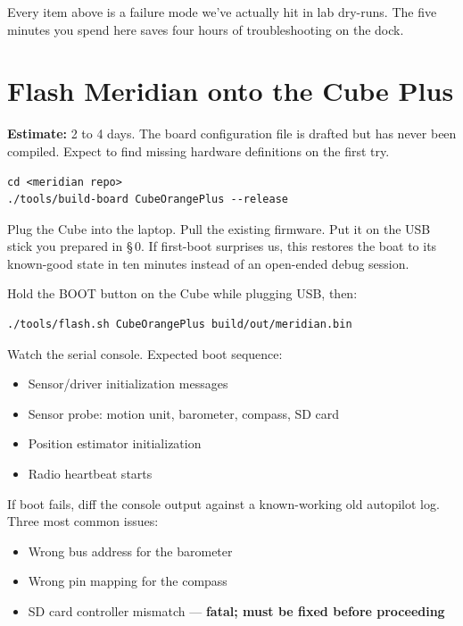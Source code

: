 \documentclass[10pt,a4paper]{article}
\begin{document}
\begin{tipbox}
Every item above is a failure mode we've actually hit in lab dry-runs.
The five minutes you spend here saves four hours of troubleshooting
on the dock.
\end{tipbox}

\section{Flash Meridian onto the Cube Plus}
\textbf{Estimate:} 2 to 4 days. The board configuration file is drafted
but has never been compiled. Expect to find missing hardware
definitions on the first try.

\begin{stepbox}
\begin{lstlisting}
cd <meridian repo>
./tools/build-board CubeOrangePlus --release
\end{lstlisting}
\end{stepbox}

\begin{stepbox}
Plug the Cube into the laptop. Pull the existing firmware. Put it on
the USB stick you prepared in §\,0. If first-boot surprises us, this
restores the boat to its known-good state in ten minutes instead of an
open-ended debug session.
\end{stepbox}

\begin{stepbox}
Hold the BOOT button on the Cube while plugging USB, then:
\begin{lstlisting}
./tools/flash.sh CubeOrangePlus build/out/meridian.bin
\end{lstlisting}
\end{stepbox}

\begin{stepbox}
Watch the serial console. Expected boot sequence:
\begin{itemize}
\item Sensor/driver initialization messages
\item Sensor probe: motion unit, barometer, compass, SD card
\item Position estimator initialization
\item Radio heartbeat starts
\end{itemize}

If boot fails, diff the console output against a known-working old
autopilot log. Three most common issues:
\begin{itemize}
\item Wrong bus address for the barometer
\item Wrong pin mapping for the compass
\item SD card controller mismatch --- \textbf{fatal; must be fixed before proceeding}
\end{itemize}
\end{stepbox}
\end{document}
